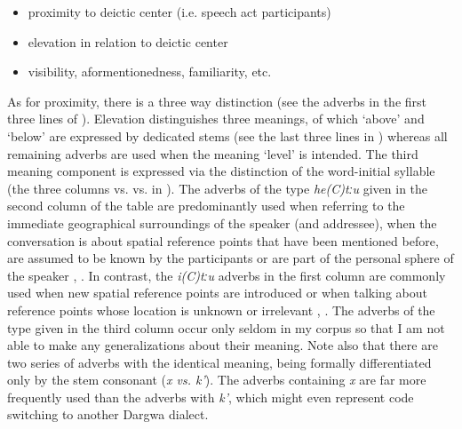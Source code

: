 \begin{itemize}
	\item	proximity to deictic center (i.e. speech act participants)
	\item	elevation in relation to deictic center
	\item	visibility, aformentionedness, familiarity, etc.
\end{itemize}
As for proximity, there is a three way distinction (see the adverbs in the first three lines of ). Elevation distinguishes three meanings, of which `above' and `below' are expressed by dedicated stems (see the last three lines in ) whereas all remaining adverbs are used when the meaning `level' is intended. The third meaning component is expressed via the distinction of the word-initial syllable (the three columns  vs.  vs.  in ). The adverbs of the type \textit{he(C)tːu} given in the second column of the table are predominantly used when referring to the immediate geographical surroundings of the speaker (and addressee), when the conversation is about spatial reference points that have been mentioned before, are assumed to be known by the participants or are part of the personal sphere of the speaker , . In contrast, the \textit{i(C)tːu} adverbs in the first column are commonly used when new spatial reference points are introduced or when talking about reference points whose location is unknown or irrelevant , . The adverbs of the  type given in the third column occur only seldom in my corpus so that I am not able to make any generalizations about their meaning. Note also that there are two series of adverbs with the identical meaning, being formally differentiated only by the stem consonant (\textit{x vs. k'}). The adverbs containing \textit{x} are far more frequently used than the adverbs with \textit{k'}, which might even represent code switching to another Dargwa dialect.
%


